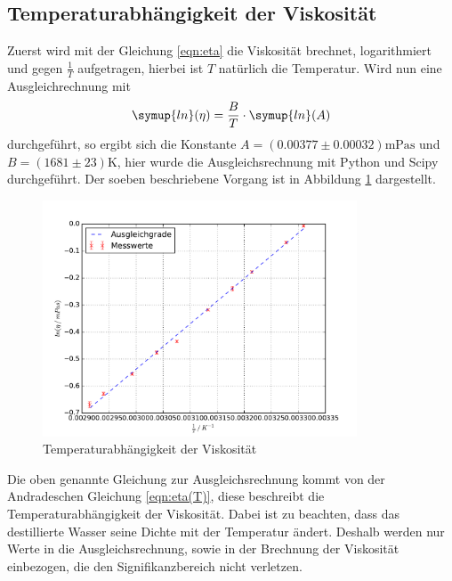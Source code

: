 \subsection{Temperaturabhängigkeit der Viskosität}
Zuerst wird mit der Gleichung \eqref{eqn:eta} die Viskosität brechnet, logarithmiert
und gegen $\frac{1}{T}$ aufgetragen, hierbei ist $T$ natürlich die Temperatur.
Wird nun eine Ausgleichrechnung mit
\begin{equation*}
  \symup{ln}(\eta)= \frac{B}{T}\cdot\symup{ln}(A)
\end{equation*}
durchgeführt, so ergibt sich die Konstante $ A =  (0.00377 \pm 0.00032)
\si{\milli\pascal\second}$ und $B = (1681 \pm 23) \si{\kelvin}$, hier wurde
die Ausgleichsrechnung mit Python und Scipy \cite{scipy} durchgeführt. Der soeben
beschriebene Vorgang ist in Abbildung \ref{fig:plot} dargestellt.
\begin{figure}
  \centering
  \includegraphics[height= 7cm]{Plots/plot.pdf}
  \caption{Temperaturabhängigkeit der Viskosität}
  \label{fig:plot}
\end{figure}
Die oben genannte Gleichung zur Ausgleichsrechnung kommt von der Andradeschen
Gleichung \eqref{eqn:eta(T)}, diese beschreibt die Temperaturabhängigkeit der
Viskosität.
Dabei ist zu beachten,
dass das destillierte Wasser seine Dichte mit der Temperatur ändert. Deshalb
werden nur Werte in die Ausgleichsrechnung, sowie in der Brechnung der
Viskosität einbezogen, die den Signifikanzbereich nicht verletzen.
